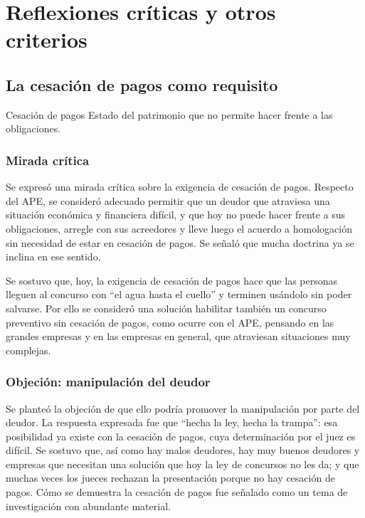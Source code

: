 \documentclass[12pt,oneside]{book}
\begin{document}
\chapter[Reflexiones críticas y otros criterios]{Reflexiones críticas y otros criterios}

\section{La cesación de pagos como requisito}

\begin{definition}{Cesación de pagos}
Estado del patrimonio que no permite hacer frente a las obligaciones.
\end{definition}

\subsection{Mirada crítica}

Se expresó una mirada crítica sobre la exigencia de cesación de pagos. Respecto del APE, se consideró adecuado permitir que un deudor que atraviesa una situación económica y financiera difícil, y que hoy no puede hacer frente a sus obligaciones, arregle con sus acreedores y lleve luego el acuerdo a homologación sin necesidad de estar en cesación de pagos. Se señaló que mucha doctrina ya se inclina en ese sentido.

Se sostuvo que, hoy, la exigencia de cesación de pagos hace que las personas lleguen al concurso con ``el agua hasta el cuello'' y terminen usándolo sin poder salvarse. Por ello se consideró una solución habilitar también un concurso preventivo sin cesación de pagos, como ocurre con el APE, pensando en las grandes empresas y en las empresas en general, que atraviesan situaciones muy complejas.

\subsection{Objeción: manipulación del deudor}

Se planteó la objeción de que ello podría promover la manipulación por parte del deudor. La respuesta expresada fue que ``hecha la ley, hecha la trampa'': esa posibilidad ya existe con la cesación de pagos, cuya determinación por el juez es difícil. Se sostuvo que, así como hay malos deudores, hay muy buenos deudores y empresas que necesitan una solución que hoy la ley de concursos no les da; y que muchas veces los jueces rechazan la presentación porque no hay cesación de pagos. Cómo se demuestra la cesación de pagos fue señalado como un tema de investigación con abundante material.
\end{document}
